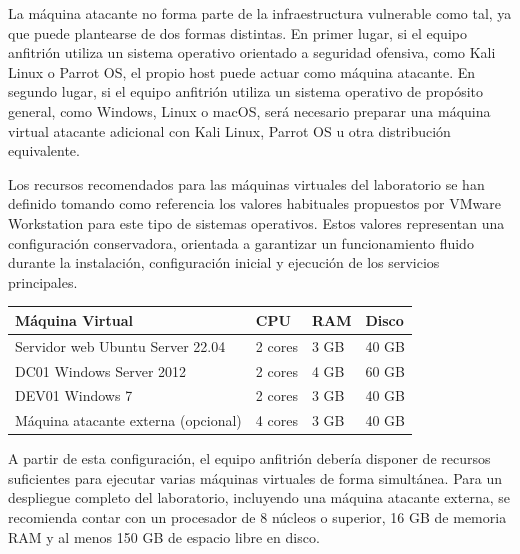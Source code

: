 La máquina atacante no forma parte de la infraestructura vulnerable como tal, ya que puede plantearse de dos formas distintas. En primer lugar, si el equipo anfitrión utiliza un sistema operativo orientado a seguridad ofensiva, como Kali Linux o Parrot OS, el propio host puede actuar como máquina atacante. En segundo lugar, si el equipo anfitrión utiliza un sistema operativo de propósito general, como Windows, Linux o macOS, será necesario preparar una máquina virtual atacante adicional con Kali Linux, Parrot OS u otra distribución equivalente.

Los recursos recomendados para las máquinas virtuales del laboratorio se han definido tomando como referencia los valores habituales propuestos por VMware Workstation para este tipo de sistemas operativos. Estos valores representan una configuración conservadora, orientada a garantizar un funcionamiento fluido durante la instalación, configuración inicial y ejecución de los servicios principales.

\vspace{0.5cm}
\renewcommand{\arraystretch}{1.5}

\begin{table}[H]
    \centering

    \setlength{\arrayrulewidth}{0.05mm}

    \begin{tabular}{|C{6.5cm}|C{2cm}|C{2cm}|C{2cm}|}
        \hline
        \textbf{Máquina Virtual} & \textbf{CPU} & \textbf{RAM} & \textbf{Disco} \\
        \hline
        Servidor web Ubuntu Server 22.04 & 2 cores & 3 GB & 40 GB \\
        \hline
        DC01 Windows Server 2012 & 2 cores & 4 GB & 60 GB \\
        \hline
        DEV01 Windows 7 & 2 cores & 3 GB & 40 GB \\
        \hline
        Máquina atacante externa (opcional) & 4 cores & 3 GB & 40 GB \\
        \hline
    \end{tabular}

    \renewcommand{\arraystretch}{1}
    \label{tab:recursos_recomendados_vm}
\end{table}
\vspace{0.5cm}

A partir de esta configuración, el equipo anfitrión debería disponer de recursos suficientes para ejecutar varias máquinas virtuales de forma simultánea. Para un despliegue completo del laboratorio, incluyendo una máquina atacante externa, se recomienda contar con un procesador de 8 núcleos o superior, 16 GB de memoria RAM y al menos 150 GB de espacio libre en disco.


